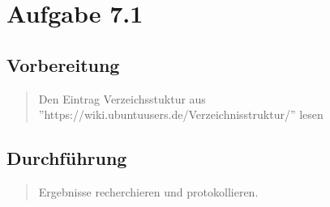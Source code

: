 \section{Aufgabe 7.1}
	\subsection{Vorbereitung}
		\begin{quote}
			Den Eintrag Verzeichsstuktur aus \\ ''https://wiki.ubuntuusers.de/Verzeichnisstruktur/'' lesen\\
		\end{quote}
	\subsection{Durchführung}
		\begin{quote}
			Ergebnisse recherchieren und protokollieren.\\
		\end{quote}
